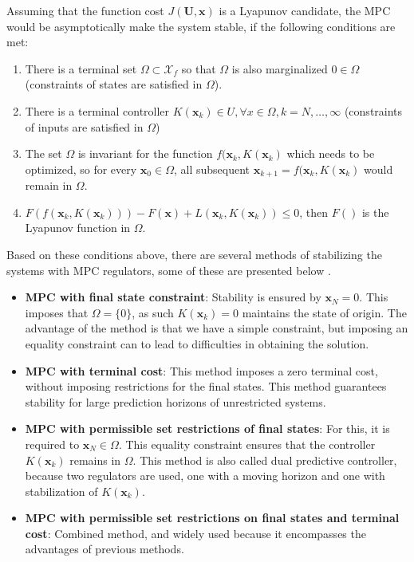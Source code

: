 Assuming that the function cost $J(\textbf{U},\textbf{x})$ is a Lyapunov candidate, the MPC would be asymptotically make the system stable, if the following conditions are met:
\begin{enumerate}
	\item There is a terminal set $\Omega\subset \mathcal{X}_f$ so that $\Omega$ is also marginalized $0\in\Omega$ (constraints of states are satisfied in $\Omega$).
	\item There is a terminal controller $K(\textbf{x}_k)\in U, \forall x\in\Omega,k=N,\dots,\infty$ (constraints of inputs are satisfied in $\Omega$)
	\item The set $\Omega$ is invariant for the function $f(\textbf{x}_k,K(\textbf{x}_k)$ which needs to be optimized, so for every $\textbf{x}_0\in\Omega$, all subsequent $\textbf{x}_{k+1}=f(\textbf{x}_k,K(\textbf{x}_k)$ would remain in $\Omega$.
	\item $F(f(\textbf{x}_k,K(\textbf{x}_k)))-F(\textbf{x})+L(\textbf{x}_k,K(\textbf{x}_k))\leq 0$, then $F()$ is the Lyapunov function in $\Omega$.
\end{enumerate}

Based on these conditions above, there are several methods of stabilizing the systems with MPC regulators, some of these are presented below \cite{herceg2009real}.

\begin{itemize}
	\item \textbf{MPC with final state constraint}: Stability is ensured by $\textbf{x}_N=0$. This imposes that $\Omega=\{0\}$, as such $K(\textbf{x}_k)=0$ maintains the state of origin. The advantage of the method is that we have a simple constraint, but imposing an equality constraint can to lead to difficulties in obtaining the solution.
	\item \textbf{MPC with terminal cost}: This method imposes a zero terminal cost, without imposing restrictions
for the final states. This method guarantees stability for large prediction horizons
of unrestricted systems.
	\item \textbf{MPC with permissible set restrictions of final states}: For this, it is required to $\textbf{x}_N\in\Omega$. This equality constraint ensures that the controller $K(\textbf{x}_k)$ remains in $\Omega$. This method is also called dual predictive controller, because two regulators are used, one with a moving horizon and one with stabilization of $K(\textbf{x}_k)$.
	\item \textbf{MPC with permissible set restrictions on final states and terminal cost}: Combined method, and widely used because it encompasses the advantages of previous methods.
\end{itemize}

